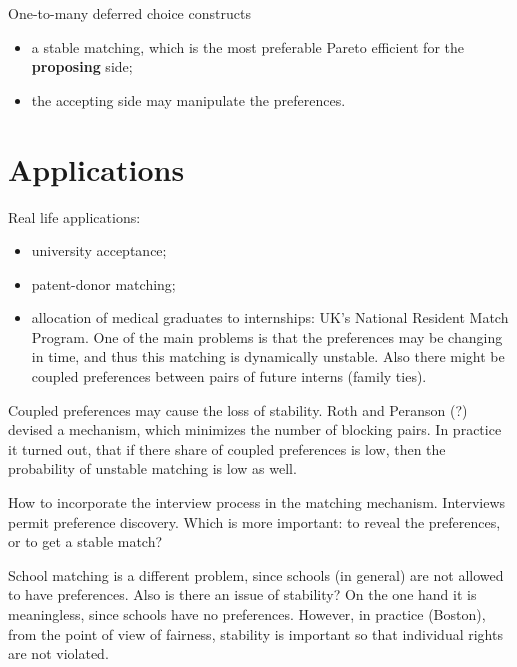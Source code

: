 \documentclass[a4paper]{article}
\begin{document}
One-to-many deferred choice constructs
\begin{itemize}
	\item a stable matching, which is the most preferable Pareto efficient for the \textbf{proposing} side;
	\item the accepting side may manipulate the preferences.
\end{itemize}


\section{Applications} %
\label{sec:applications}

Real life applications:
\begin{itemize}
	\item university acceptance;
	\item patent-donor matching;
	\item allocation of medical graduates to internships: UK's National Resident Match Program.
	One of the main problems is that the preferences may be changing in time, and thus this matching
	is dynamically unstable. Also there might be coupled preferences between pairs of future interns
	(family ties).
\end{itemize}

Coupled preferences may cause the loss of stability. Roth and Peranson (?) devised a mechanism,
which minimizes the number of blocking pairs. In practice it turned out, that if there share
of coupled preferences is low, then the probability of unstable matching is low as well.

How to incorporate the interview process in the matching mechanism. Interviews permit preference
discovery. Which is more important: to reveal the preferences, or to get a stable match?

School matching is a different problem, since schools (in general) are not allowed to have preferences.
Also is there an issue of stability? On the one hand it is meaningless, since schools have no preferences.
However, in practice (Boston), from the point of view of fairness, stability is important so that 
individual rights are not violated.



\end{document}
